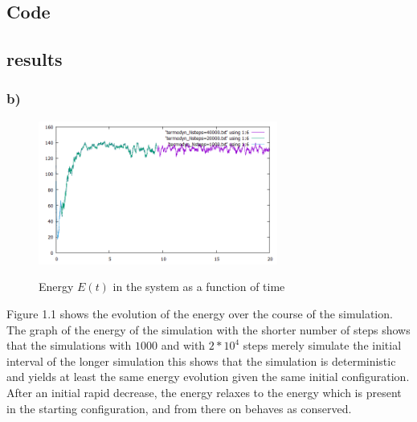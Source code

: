 \documentclass[12pt,a4paper]{article}	%
\begin{document}
\subsection{Code}

%

%

\newpage
\subsection{results}


\subsubsection*{b)}

\begin{figure}[h!]	
\centering
{\includegraphics[width=0.7\textwidth]{E(t).png}}		
\caption{Energy $E(t)$ in the system as a function of time}
\end{figure}
Figure 1.1 shows the evolution of the energy over the course of the simulation. The graph of the energy of the simulation with the shorter number of steps shows that the simulations with $1000$ and with $2*10^4$ steps merely simulate the initial interval of the longer simulation this shows that the simulation is deterministic and yields at least the same energy evolution given the same initial configuration. \\
After an initial rapid decrease, the energy relaxes to the energy which is present in the starting configuration, and from there on behaves as conserved. 
\end{document}
